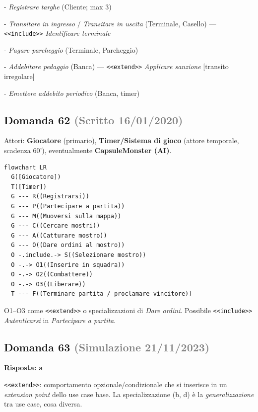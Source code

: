 \documentclass[a4paper,11pt]{article}
\begin{document}
- \textit{Registrare targhe} (Cliente; max 3)

- \textit{Transitare in ingresso} / \textit{Transitare in uscita} (Terminale, Casello) — \texttt{\textless{}\textless{}include\textgreater{}\textgreater{}} \textit{Identificare terminale}

- \textit{Pagare parcheggio} (Terminale, Parcheggio)

- \textit{Addebitare pedaggio} (Banca) — \texttt{\textless{}\textless{}extend\textgreater{}\textgreater{}} \textit{Applicare sanzione} [transito irregolare]

- \textit{Emettere addebito periodico} (Banca, timer)



\subsection*{Domanda 62 \hfill {\small \textcolor{gray}{(Scritto 16/01/2020)}}}
Attori: \textbf{Giocatore} (primario), \textbf{Timer/Sistema di gioco} (attore temporale, scadenza 60'), eventualmente \textbf{CapsuleMonster (AI)}.

\begin{verbatim}
flowchart LR
  G([Giocatore])
  T([Timer])
  G --- R((Registrarsi))
  G --- P((Partecipare a partita))
  G --- M((Muoversi sulla mappa))
  G --- C((Cercare mostri))
  G --- A((Catturare mostro))
  G --- O((Dare ordini al mostro))
  O -.include.-> S((Selezionare mostro))
  O -.-> O1((Inserire in squadra))
  O -.-> O2((Combattere))
  O -.-> O3((Liberare))
  T --- F((Terminare partita / proclamare vincitore))
\end{verbatim}
O1–O3 come \texttt{\textless{}\textless{}extend\textgreater{}\textgreater{}} o specializzazioni di \textit{Dare ordini}. Possibile \texttt{\textless{}\textless{}include\textgreater{}\textgreater{}} \textit{Autenticarsi} in \textit{Partecipare a partita}.



\subsection*{Domanda 63 \hfill {\small \textcolor{gray}{(Simulazione 21/11/2023)}}}
\textbf{Risposta: a}\par
\texttt{\textless{}\textless{}extend\textgreater{}\textgreater{}}: comportamento opzionale/condizionale che si inserisce in un \textit{extension point} dello use case base. La specializzazione (b, d) è la \textit{generalizzazione} tra use case, cosa diversa.
\end{document}
